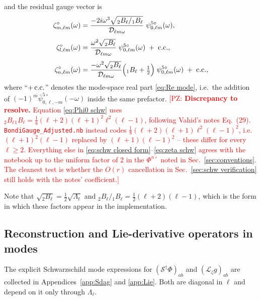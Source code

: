 \documentclass[preprint,aps,nofootinbib,a4paper,superscriptaddress,longbibliography,amsfonts, amssymb,amsmath,titlepage]{revtex4-1}
\numberwithin{equation}{section} %
\newcommand{\PZ}[1]{\textcolor{red}{\textsf{[PZ: #1]}}}
\newcommand{\emm}{m}
\def\l{\ensuremath{\ell}}
\renewcommand{\S}{{\mathcal S}}
\newcommand{\Lie}{{\mathcal L}}
\newcommand{\Bco}[1]{{}_{#1}B_{\l}}                 %
\def\LamL{\Lambda_{\l}}                             %
\def\Dlw{\mathcal{D}_{\l\emm\omega}}                %
\newcommand{\PhiN}[1]{\Phi^{#1\circ}}
\newcommand{\psifiveM}[1]{\psi^{5\circ}_{0,#1}}       %
\newcommand{\zetalM}[1]{\zeta^{\circ}_{l,#1}}
\newcommand{\zetanM}[1]{\zeta^{\circ}_{n,#1}}
\newcommand{\zetamM}[1]{\zeta^{\circ}_{m,#1}}
\begin{document}
and the residual gauge vector is
\begin{subequations}\label{eq:zeta schw}
\begin{align}
\zetamM{\l\emm}(\omega)
&=
\frac{-2i\omega^{3}\sqrt{\Bco{2}/\Bco{1}}}{\Dlw}
\;\psifiveM{\l\emm}(\omega),
\label{eq:zeta m schw}\\[4pt]
\zetalM{\l\emm}(\omega)
&=
\frac{\omega^{2}\sqrt{\Bco{2}}}{\Dlw}
\;\psifiveM{\l\emm}(\omega)\;+\;{\rm c.c.},
\label{eq:zeta l schw}\\[4pt]
\zetanM{\l\emm}(\omega)
&=
\frac{-\omega^{2}\sqrt{\Bco{2}}}{\Dlw}
\Big(\Bco{1}+\tfrac12\Big)
\;\psifiveM{\l\emm}(\omega)\;+\;{\rm c.c.},
\label{eq:zeta n schw}
\end{align}
\end{subequations}
where ``$+\,{\rm c.c.}$'' denotes the mode-space real part \eqref{eq:Re mode},
i.e.\ the addition of $(-1)^{\emm}\bar\psi^{5\circ}_{0,\l,-\emm}(-\omega)$
inside the same prefactor.
\PZ{\textbf{Discrepancy to resolve.}  Equation \eqref{eq:Phi0 schw} uses
$\Bco{2}\Bco{1} = \tfrac18(\l+2)(\l+1)^{2}\l^{2}(\l-1)$, following
Vahid's notes Eq.~(29).  \texttt{BondiGauge\_Adjusted.nb} instead codes
$\tfrac18(\l+2)(\l+1)\l^{2}(\l-1)^{2}$, i.e.\ $(\l+1)^2(\l-1)$ replaced by
$(\l+1)(\l-1)^2$ -- these differ for every $\l\ge2$.  Everything else in
\eqref{eq:schw closed form}--\eqref{eq:zeta schw} agrees with the notebook up
to the uniform factor of 2 in the $\PhiN{n}$ noted in
Sec.~\ref{sec:conventions}.  The cleanest test is whether the $O(r)$
cancellation in Sec.~\ref{sec:schw verification} still holds with the notes'
coefficient.}

Note that $\sqrt{\Bco{2}}=\tfrac12\sqrt{\LamL}$ and
$\Bco{2}/\Bco{1} = \tfrac12(\l+2)(\l-1)$, which is the form in which these
factors appear in the implementation.

\subsection{Reconstruction and Lie-derivative operators in modes}
\label{sec:schw operators}
The explicit Schwarzschild mode expressions for
$(\S^{\dagger}\Phi)_{ab}$ and $(\Lie_{\zeta}g)_{ab}$ are collected in
Appendices~\ref{app:Sdag} and \ref{app:Lie}.  Both are diagonal in $\l$ and
depend on it only through $\LamL$.
\end{document}
